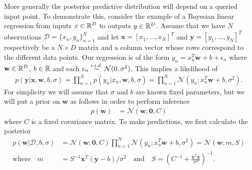 More generally the posterior predictive distribution will depend on a queried input point.
To demonstrate this, consider the example of a Bayesian linear regression from inputs $x\in\mathbb{R}^D$
to outputs $y\in\mathbb{R}^D$.  Assume that we have $N$ observations $\mathcal{D} = \{x_n,y_n\}_{n=1}^N$
and let $\mathbf{x}=[x_1,\dots,x_N]^T$ and $\mathbf{y}=[y_1,\dots,y_N]^T$ respectively be 
a $N\times D$ matrix and a column vector whose rows correspond to the different data points.
Our regression is of the form $y_n= x_n^T\mathbf{w}+b+\epsilon_n$ where $\mathbf{w}\in\mathbb{R}^D$, $b\in\mathbb{R}$
and each $\epsilon_n \overset{i.i.d.}{\sim} \mathcal{N}(0,\sigma^2)$.  This implies a likelihood of
\begin{align}
\label{eq:bayes:linear-reg-lik}
p(\mathbf{y}|\mathbf{x},\mathbf{w},b,\sigma) = \prod_{n=1}^{N} p(y_n | x_n, \mathbf{w}, b, \sigma) = 
\prod_{n=1}^{N} \mathcal{N}(y_n;x_n^T\mathbf{w}+b,\sigma^2).
\end{align}
For simplicity we will assume that $\sigma$ and $b$ are known fixed parameters,
but we will put a prior on $\mathbf{w}$ as follows in order to perform inference
\begin{align}
\label{eq:bayes:linear-reg-w}
p(\mathbf{w}) &= \mathcal{N}(\mathbf{w};\mathbf{0},C)
\end{align}
where $C$ is a fixed covariance matrix.
To make predictions, we first calculate the posterior
\begin{align}
p(\mathbf{w}| \mathcal{D}, b,\sigma) &= \mathcal{N}(\mathbf{w};\mathbf{0},C)
\prod_{n=1}^{N} \mathcal{N}(y_n;x_n^T \mathbf{w}+b,\sigma^2) = \mathcal{N}\left(\mathbf{w} ; m, S\right) \\
\mathrm{where} \quad m &= S^{-1} \mathbf{x}^T \left(\mathbf{y}-b\right)/\sigma^2 \quad
\mathrm{and} \quad S = \left( C^{-1}+\frac{\mathbf{x}^T\mathbf{x}}{\sigma^2}\right)^{-1}. \nonumber
\end{align}
